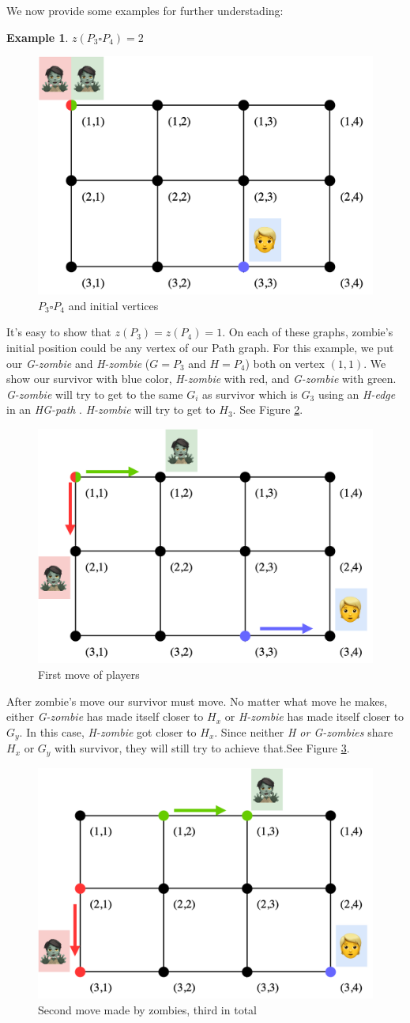 \documentclass[1p]{elsarticle}
\newtheorem{example}[theorem]{Example}
\begin{document}
We now provide some examples for further understading:
\begin{example} $z(P_3 \square P_4 ) = 2$
	
\end{example}
\begin{figure}[h!]
	\centering
	\includegraphics[width=0.5\linewidth]{fig/p34m1.png}
	\caption{$P_3 \square P_4$ and initial vertices}
	\label{fig:p3}
\end{figure}
It's easy to show that $z(P_3) = z(P_4) = 1$. On each of these graphs, zombie's initial position could be any vertex of
our Path graph. For this example, we put our {\it G-zombie} and {\it H-zombie} ($G = P_3$ and $H = P_4$) both on vertex
$(1,1)$. We show our survivor with blue color, {\it H-zombie} with red, and {\it G-zombie} with green. {\it G-zombie}
will try to get to the same $G_{i}$ as survivor which is $G_3$ using an {\it H-edge} in an {\it HG-path} . {\it
H-zombie} will try to get to $H_3$. See Figure \ref{fig:p4}.
\begin{figure}[h!]
	\centering
	\includegraphics[width=0.5\linewidth]{fig/p34m2.png}
	\caption{First move of players}
	\label{fig:p4}
\end{figure}
After zombie's move our survivor must move. No matter what move he makes, either {\it G-zombie} has made itself closer
to $H_x$ or {\it H-zombie} has made itself closer to $G_y$. In this case, {\it H-zombie} got closer to  $H_x$. Since
neither {\it H or G-zombies}  share $H_x$ or $G_y$ with survivor, they will still try to achieve that.See Figure
\ref{fig:p5}.
\begin{figure}[h!]
	\centering
	\includegraphics[width=0.5\linewidth]{fig/p34m3.png}
	\caption{Second move made by zombies, third in total}
	\label{fig:p5}
\end{figure}
\end{document}
